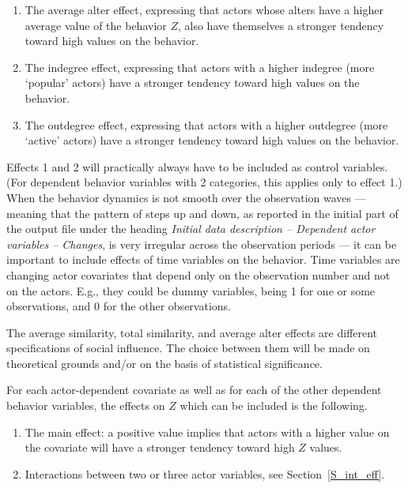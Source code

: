 \documentclass[a4paper,fleqn]{article}
\newcommand{\+}{\, + \,}
\begin{document}
{\begin{enumerate}
      to being similar to their alters,
      where the total influence of the alters is proportional to
      the number of alters.
\item The average alter effect, expressing that actors
      whose alters have a higher average value of the behavior $Z$,
      also have themselves a stronger tendency toward high values on the behavior.
\item The indegree effect, expressing that actors with a higher indegree
      (more `popular' actors) have a stronger tendency toward high values on the behavior.
\item The outdegree effect, expressing that actors with a higher outdegree
      (more `active' actors) have a stronger tendency toward high values on the behavior.
\end{enumerate}
Effects 1 and 2 will practically always have to be included as control variables.
(For dependent behavior variables with 2 categories, this applies only to effect 1.)
When the behavior dynamics is not smooth over the observation waves --- meaning that
the pattern of steps up and down, as reported in the initial part of the output
file under the heading \emph{Initial data description -- Dependent actor variables -- Changes},
is very irregular across the observation periods --- it can be important to include
effects of time variables on the behavior.
Time variables are changing actor covariates that depend only on the
observation number and not on the actors. E.g., they could be dummy variables, being 1
for one or some observations, and 0 for the other observations.

The average similarity, total similarity, and average alter effects
are different specifications of social influence.
The choice between them will be made on theoretical grounds
and/or on the basis of statistical significance.
\medskip

For each actor-dependent covariate as well as for each of the other
dependent behavior variables,
the effects on $Z$ which can be included is the following.
\begin{enumerate}
\item The main effect: a positive value implies that actors with a
      higher value on the covariate will have a stronger tendency
      toward high $Z$ values.

\item Interactions between two or three actor variables, see
      Section~\ref{S_int_eff}.
\end{enumerate}


}
\end{document}

